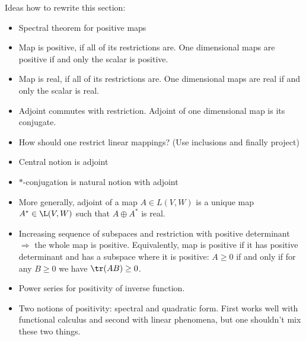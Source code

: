 Ideas how to rewrite this section:
\begin{itemize}
	\item Spectral theorem for positive maps
	\item Map is positive, if all of its restrictions are. One dimensional maps are positive if and only the scalar is positive.
	\item Map is real, if all of its restrictions are. One dimensional maps are real if and only the scalar is real.
	\item Adjoint commutes with restriction. Adjoint of one dimensional map is its conjugate.
	\item How should one restrict linear mappings? (Use inclusions and finally project)
	\item Central notion is adjoint
	\item $*$-conjugation is natural notion with adjoint
	\item More generally, adjoint of a map $A \in L(V, W)$ is a unique map $A^{*} \in \L(V, W)$ such that $A \oplus A^{*}$ is real.
	\item Increasing sequence of subspaces and restriction with positive determinant $\Rightarrow$ the whole map is positive. Equivalently, map is positive if it has positive determinant and has a subspace where it is positive: $A \geq 0$ if and only if for any $B \geq 0$ we have $\tr(A B) \geq 0$.
	\item Power series for positivity of inverse function.
	\item Two notions of positivity: spectral and quadratic form. First works well with functional calculus and second with linear phenomena, but one shouldn't mix these two things.
\end{itemize}





